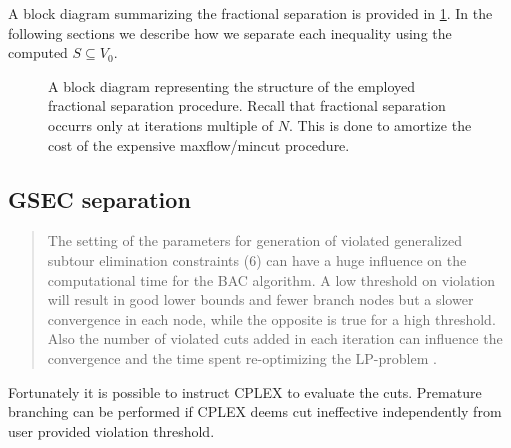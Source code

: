 A block diagram summarizing the fractional separation is provided in \cref{fig:fractional-separation-block-diagram}.
In the following sections we describe how we separate each inequality using the computed $S \subseteq V_0$.

\begin{figure}[ht]
	\centering
	\caption{A block diagram representing the structure of the employed fractional separation procedure. Recall that fractional separation occurrs only at iterations multiple of $N$. This is done to amortize the cost of the expensive maxflow/mincut procedure.}
	\label{fig:fractional-separation-block-diagram}
\end{figure}

\subsection{GSEC separation}
\label{sec:impl-gsec-separation}

\begin{quote}
	The setting of the parameters for generation of violated generalized subtour elimination constraints
	(6) can have a huge influence on the computational time for the BAC algorithm. A low threshold on
	violation will result in good lower bounds and fewer branch nodes but a slower convergence in each
	node, while the opposite is true for a high threshold. Also the number of violated cuts added in each
	iteration can influence the convergence and the time spent re-optimizing the LP-problem \cite{jepsen2008branchandcut}.
\end{quote}

Fortunately it is possible to instruct CPLEX to evaluate the cuts.
Premature branching can be performed if CPLEX deems cut ineffective independently
from user provided violation threshold.

